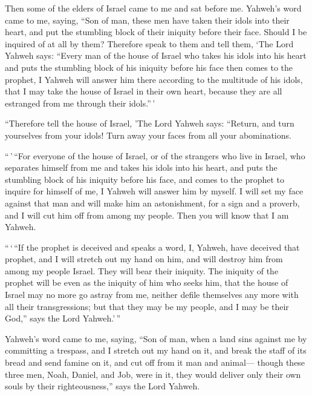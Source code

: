  Then some of the elders of Israel came to me and sat
before me.  Yahweh's word came to me, saying,
 ``Son of man, these men have taken their idols into their
heart, and put the stumbling block of their iniquity before their face.
Should I be inquired of at all by them?  Therefore speak
to them and tell them, `The Lord Yahweh says: ``Every man of the house
of Israel who takes his idols into his heart and puts the stumbling
block of his iniquity before his face then comes to the prophet, I
Yahweh will answer him there according to the multitude of his idols,
 that I may take the house of Israel in their own heart,
because they are all estranged from me through their idols.''\,'

 ``Therefore tell the house of Israel, 'The Lord Yahweh
says: ``Return, and turn yourselves from your idols! Turn away your
faces from all your abominations.

 ``\,'\,``For everyone of the house of Israel, or of the
strangers who live in Israel, who separates himself from me and takes
his idols into his heart, and puts the stumbling block of his iniquity
before his face, and comes to the prophet to inquire for himself of me,
I Yahweh will answer him by myself.  I will set my face
against that man and will make him an astonishment, for a sign and a
proverb, and I will cut him off from among my people. Then you will know
that I am Yahweh.

 ``\,`\,``If the prophet is deceived and speaks a word, I,
Yahweh, have deceived that prophet, and I will stretch out my hand on
him, and will destroy him from among my people Israel. 
They will bear their iniquity. The iniquity of the prophet will be even
as the iniquity of him who seeks him,  that the house of
Israel may no more go astray from me, neither defile themselves any more
with all their transgressions; but that they may be my people, and I may
be their God,'' says the Lord Yahweh.'\,''

 Yahweh's word came to me, saying,  ``Son
of man, when a land sins against me by committing a trespass, and I
stretch out my hand on it, and break the staff of its bread and send
famine on it, and cut off from it man and animal--- 
though these three men, Noah, Daniel, and Job, were in it, they would
deliver only their own souls by their righteousness,'' says the Lord
Yahweh.

